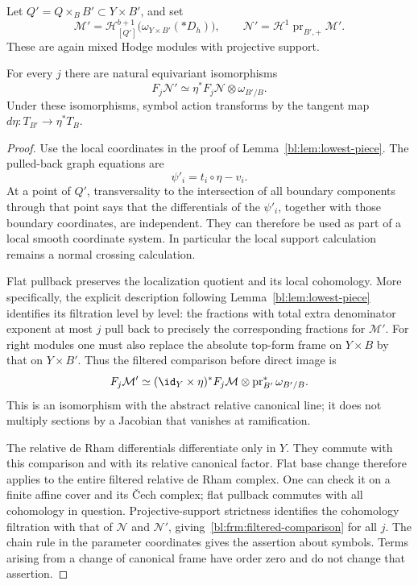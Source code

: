 Let $Q'=Q\times_B B'\subset Y\times B'$, and set
\begin{equation}\label{bl:frm:basechanged-modules}
 \mathcal M'=\mathcal H^{b+1}_{[Q']}
     \bigl(\omega_{Y\times B'}(*D_h)\bigr),
 \qquad
 \mathcal N'=\mathcal H^1\operatorname{pr}_{B',+}\mathcal M'.
\end{equation}
These are again mixed Hodge modules with projective support.

\begin{lemma}\label{bl:frm:comparison}
For every $j$ there are natural equivariant isomorphisms
\begin{equation}\label{bl:frm:filtered-comparison}
 F_j\mathcal N'
   \simeq \eta^*F_j\mathcal N\otimes\omega_{B'/B}.
\end{equation}
Under these isomorphisms, symbol action transforms by the tangent
map $d\eta:T_{B'}\to\eta^*T_B$.
\end{lemma}

\begin{proof}
Use the local coordinates in the proof of
Lemma~\ref{bl:lem:lowest-piece}. The pulled-back graph equations are
\[
 \psi'_i=t_i\circ\eta-v_i.
\]
At a point of $Q'$, transversality to the intersection of all
boundary components through that point says that the differentials
of the $\psi'_i$, together with those boundary coordinates, are
independent. They can therefore be used as part of a local smooth
coordinate system. In particular the local support calculation
remains a normal crossing calculation.

Flat pullback preserves the localization quotient and its local
cohomology. More specifically, the explicit description following
Lemma~\ref{bl:lem:lowest-piece} identifies its filtration level by
level: the fractions with total extra denominator exponent at most
$j$ pull back to precisely the corresponding fractions for $\mathcal M'$.
For right modules one must also replace the absolute top-form
frame on $Y\times B$ by that on $Y\times B'$. Thus the filtered
comparison before direct image is
\[
 F_j\mathcal M'
  \simeq (\id_Y\times\eta)^*F_j\mathcal M
                \otimes\operatorname{pr}_{B'}^*\omega_{B'/B}.
\]
This is an isomorphism with the abstract relative canonical line;
it does not multiply sections by a Jacobian that vanishes at
ramification.

The relative de Rham differentials differentiate only in $Y$.
They commute with this comparison and with its relative canonical
factor. Flat base change therefore applies to the entire filtered
relative de Rham complex. One can check it on a finite affine
cover and its \v{C}ech complex; flat pullback commutes with all
cohomology in question. Projective-support strictness identifies
the cohomology filtration with that of $\mathcal N$ and
$\mathcal N'$, giving~\eqref{bl:frm:filtered-comparison} for all $j$.
The chain rule in the parameter coordinates gives the assertion
about symbols. Terms arising from a change of canonical frame
have order zero and do not change that assertion.
\end{proof}

